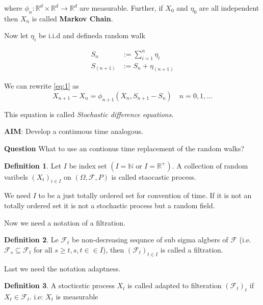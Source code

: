 \documentclass[
]{book}
\theoremstyle{definition}
\newtheorem{definition}{Definition}[chapter]
\theoremstyle{definition}
\theoremstyle{definition}
\theoremstyle{definition}
\theoremstyle{remark}
\begin{document}
where \(\phi_n:\mathbb{R}^d\times \mathbb{R}^d\to \mathbb{R}^d\) are measurable. Further, if \(X_0\) and \(\eta_0\) are all independent then \(X_n\) is called \textbf{Markov Chain}.

Now let \(\eta_i\) be i.i.d and defineda random walk

\begin{align}
S_n&:=\sum_{i=1}^n \eta_i\\
S_{(n+1)}&:=S_n+\eta_{(n+1)}
\end{align}

We can rewrite \eqref{eq:1} as
\[X_{n+1}-X_n=\phi_{n+1}(X_n,S_{n+1}-S_n)\quad n=0,1,...\]

This equation is called \emph{Stochastic difference equations}.

\textbf{AIM}: Develop a continuous time analogous.

\textbf{Question} What to use an contionus time replacement of the random walks?

\begin{definition}
\protect\hypertarget{def:unnamed-chunk-37}{}\label{def:unnamed-chunk-37}Let \(I\) be index set \((I=\mathbb{N} \text{ or } I=\mathbb{R}^+)\). A collection of random varibels \((X_t)_{i\in I}\) on \((\Omega,\mathcal{F},P)\) is called staocastic process.
\end{definition}

We need \(I\) to be a just totally ordered set for convention of time. If it is not an totally ordered set it is not a stochastic process but a random field.

Now we need a notation of a filtration.

\begin{definition}
\protect\hypertarget{def:unnamed-chunk-38}{}\label{def:unnamed-chunk-38}Le \(\mathcal{F}_t\) be non-decreasing sequnce of sub sigma algbers of \(\mathcal{F}\) (i.e.~\(\mathcal{F}_s\subseteq \mathcal{F}_t\) for all \(s\geq t, s,t\in \in I\)), then \((\mathcal{F}_t)_{t\in I}\) is called a filtration.
\end{definition}

Last we need the notation adaptness.

\begin{definition}
\protect\hypertarget{def:unnamed-chunk-39}{}\label{def:unnamed-chunk-39}A stocticstic process \(X_t\) is called adapted to filteration \((\mathcal{F}_t)_t\) if \(X_t\in \mathcal{F}_t\). i.e: \(X_t\) is measurable
\end{definition}
\end{document}
